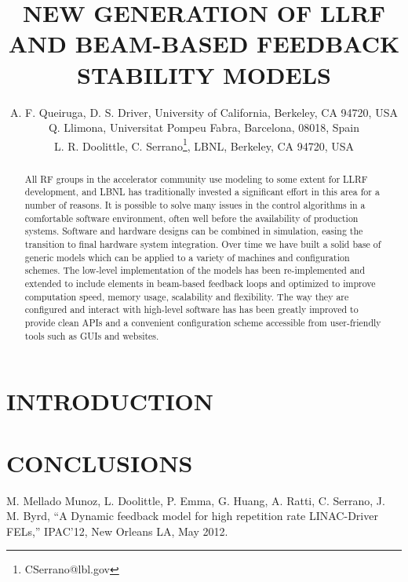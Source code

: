 \documentclass[acus]{JAC2003}
\begin{document}
\title{NEW GENERATION OF LLRF AND BEAM-BASED FEEDBACK STABILITY MODELS}

\author{A. F. Queiruga, D. S. Driver, University of California, Berkeley, CA 94720, USA\\
Q. Llimona, Universitat Pompeu Fabra, Barcelona, 08018, Spain\\
L. R. Doolittle, C. Serrano\thanks{CSerrano@lbl.gov}, LBNL, Berkeley, CA 94720, USA}

\maketitle

\begin{abstract}
    All RF groups in the accelerator community use modeling to some extent for LLRF development, and LBNL has
traditionally invested a significant effort in this area for a number of reasons. It is possible to solve many
issues in the control algorithms in a comfortable software environment, often well before the availability of production
systems. Software and hardware designs can be combined in simulation, easing the transition to final hardware system
integration.  Over time we have built a solid base of generic models which can be applied to a variety of machines and
configuration schemes. The low-level implementation of the models has been re-implemented and extended to include
elements in beam-based feedback loops and optimized to improve computation speed, memory usage, scalability and
flexibility. The way they are configured and interact with high-level software has has been greatly improved to provide clean APIs
and a convenient configuration scheme accessible from user-friendly tools such as GUIs and websites.
\end{abstract}

\section{INTRODUCTION}


\section{CONCLUSIONS}

\begin{thebibliography}{9}   %

M. Mellado Munoz, L. Doolittle, P. Emma, G. Huang, A. Ratti, C. Serrano, J. M. Byrd, ``A Dynamic feedback model for high repetition rate LINAC-Driver FELs,''
IPAC'12, New Orleans LA, May 2012.


\end{thebibliography}
\end{document}
